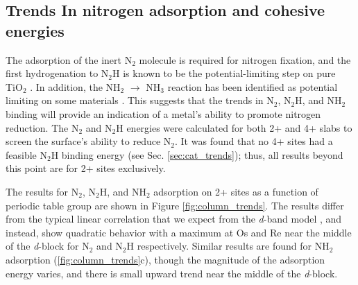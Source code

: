 
\subsection{Trends In nitrogen adsorption and cohesive energies}
\label{sec:reactivity}

The adsorption of the inert N$_2$ molecule is required for nitrogen fixation, and the first hydrogenation to N$_2$H is known to be the potential-limiting step on pure TiO$_2$ \cite{Comer_2018}. In addition, the NH$_2$ $\rightarrow$ NH$_3$ reaction has been identified as potential limiting on some materials \cite{Hoskuldsson_2017}. This suggests that the trends in N$_2$, N$_2$H, and NH$_2$ binding will provide an indication of a metal's ability to promote nitrogen reduction. The N$_2$ and N$_2$H energies were calculated for both 2+ and 4+ slabs to screen the surface's ability to reduce N$_2$. It was found that no 4+ sites had a feasible N$_2$H binding energy (see Sec. \ref{sec:cat_trends}); thus, all results beyond this point are for 2+ sites exclusively.

The results for N$_2$, N$_2$H, and NH$_2$ adsorption on 2+ sites as a function of periodic table group are shown in Figure \ref{fig:column_trends}. The results differ from the typical linear correlation that we expect from the \textit{d}-band model \cite{Nilsson_2008}, and instead, show quadratic behavior with a maximum at Os and Re near the middle of the \textit{d}-block for N$_2$ and N$_2$H respectively. Similar results are found for NH$_2$ adsorption (\ref{fig:column_trends}c), though the magnitude of the adsorption energy varies, and there is small upward trend near the middle of the \textit{d}-block. 

